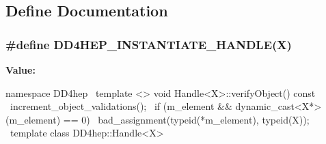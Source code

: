 \subsection{Define Documentation}
\hypertarget{_handle_8inl_ac1a93b92fc9aaa3e60484a966cc20b4f}{
\subsubsection[{DD4HEP\_\-INSTANTIATE\_\-HANDLE}]{\setlength{\rightskip}{0pt plus 5cm}\#define DD4HEP\_\-INSTANTIATE\_\-HANDLE(X)}}
\label{_handle_8inl_ac1a93b92fc9aaa3e60484a966cc20b4f}
{\bfseries Value:}
\begin{DoxyCode}
namespace DD4hep {                                                    \
    template <> void Handle<X>::verifyObject() const  {                 \
      increment_object_validations();                                   \
      if (m_element && dynamic_cast<X*>(m_element) == 0) {              \
        bad_assignment(typeid(*m_element), typeid(X));                  \
      }                                                                 \
  }}                                                                    \
  template class DD4hep::Handle<X>
\end{DoxyCode}


